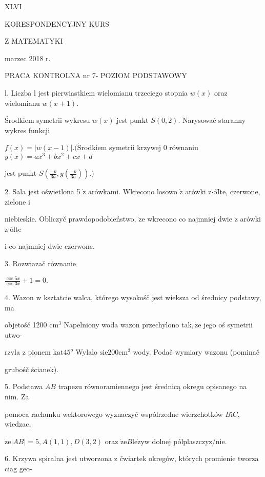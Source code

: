 \documentclass[a4paper,12pt]{article}
\begin{document}
XLVI

KORESPONDENCYJNY KURS

Z MATEMATYKI

marzec 2018 r.

PRACA KONTROLNA nr 7- POZIOM PODSTAWOWY

l. Liczba l jest pierwiastkiem wielomianu trzeciego stopnia $w(x)$ oraz wielomianu $w(x+1).$

Środkiem symetrii wykresu $w(x)$ jest punkt $S(0,2)$. Narysowač staranny wykres funkcji

$f(x)= |w(x-1)|. (\acute{\mathrm{S}}$rodkiem symetrii krzywej $0$ równaniu $y(x) =ax^{3}+bx^{2}+cx+d$

jest punkt $S(\displaystyle \frac{-b}{3a},y(\frac{-b}{3a})).$)

2. Sala jest oświetlona 5 $\dot{\mathrm{z}}$ arówkami. Wkrecono losowo $\dot{\mathrm{z}}$ arówki z$\cdot$óIte, czerwone, zielone $\mathrm{i}$

niebieskie. Obliczyč prawdopodobieństwo, $\dot{\mathrm{z}}\mathrm{e}$ wkrecono co najmniej dwie $\dot{\mathrm{z}}$ arówki z$\cdot$ólte

$\mathrm{i}$ co najmniej dwie czerwone.

3. Rozwiazač równanie

$\displaystyle \frac{\cos 5x}{\cos 3x}+1=0.$

4. Wazon $\mathrm{w}$ ksztatcie walca, którego wysokośč jest wieksza od średnicy podstawy, ma

objetośč 1200 $\mathrm{c}\mathrm{m}^{3}$ Napelniony woda wazon przechylono $\mathrm{t}\mathrm{a}\mathrm{k}, \dot{\mathrm{z}}\mathrm{e}$ jego oś symetrii utwo-

rzyla $\mathrm{z}$ pionem $\mathrm{k}\mathrm{a}\mathrm{t}45^{o}$ Wylalo $\mathrm{s}\mathrm{i}\mathrm{e}200\mathrm{c}\mathrm{m}^{3}$ wody. Podač wymiary wazonu (pominač

grubośč ścianek).

5. Podstawa $AB$ trapezu równoramiennego jest średnicą okregu opisanego na nim. Za

pomoca rachunku wektorowego wyznaczyč wspólrzedne wierzchotków $B\mathrm{i}C$, wiedzac,

$\dot{\mathrm{z}}\mathrm{e}|AB|=5, A(1,1), D(3,2)$ oraz $\dot{\mathrm{z}}\mathrm{e}B\mathrm{l}\mathrm{e}\dot{\mathrm{z}}\mathrm{y}\mathrm{w}$ dolnej pólplaszczyz/nie.

6. Krzywa spiralna jest utworzona $\mathrm{z}$ čwiartek okregów, których promienie tworza ciag geo-
\end{document}
